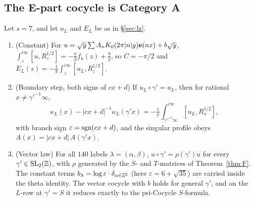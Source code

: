 \subsection{The E-part cocycle is Category A}\label{sec:rev5coc}
\begin{theorem}\label{thm:coc5}
Let $s=7$, and let $u_L$ and $E_L$ be as in \S\ref{sec:lz}.
\begin{enumerate}[label=(\roman*)]
\item (Constant) For $u=\sqrt y\sum A_nK_0(2\pi|n|y)\mathbf{e}(nx)+b\sqrt y$, $\int_z^{i\infty}[u,R_z^{1/2}]=-\tfrac\pi2 f_u(z)+\tfrac b2$, so $C=-\pi/2$ and $E_L(z)=-\tfrac1\pi\int_z^{i\infty}[u_L,R_z^{1/2}]$.
\item (Boundary step, both signs of $cx+d$) If $u_L\circ\gamma'=u_L$, then for rational $x\neq\gamma'^{-1}\infty$,
\[\kappa_L(x)-|cx+d|^{-1}\kappa_L(\gamma'x)=-\tfrac1\pi\int_{\gamma'^{-1}\infty}^{i\infty}[u_L,R_x^{1/2}],\]
with branch sign $\varepsilon=\operatorname{sgn}(cx+d)$, and the singular profile obeys $A(x)=|cx+d|\,A(\gamma'x)$.
\item (Vector law) For all $140$ labels $\lambda=(\alpha,\beta)$, $u\circ\gamma'=\rho(\gamma')u$ for every $\gamma'\in\mathrm{SL}_2(\mathbb{Z})$, with $\rho$ generated by the $S$- and $T$-matrices of
Theorem~\ref{thm:F}. The constant terms $b_\lambda=\log\varepsilon\cdot\delta_{\alpha\in\mathbb{Z}^2}$ (here $\varepsilon=6+\sqrt{35}$) are carried inside the theta identity. The vector cocycle with $b$ holds for general $\gamma'$, and on the $L$-row at $\gamma'=S$ it reduces exactly to the psi-Cocycle $S$-formula.
\end{enumerate}
\end{theorem}

